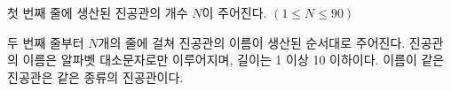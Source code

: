 첫 번째 줄에 생산된 진공관의 개수 $N$이 주어진다. $(1 \le N \le 90)$

두 번째 줄부터 $N$개의 줄에 걸쳐 진공관의 이름이 생산된 순서대로 주어진다. 
진공관의 이름은 알파벳 대소문자로만 이루어지며, 길이는 1 이상 10 이하이다.
이름이 같은 진공관은 같은 종류의 진공관이다.